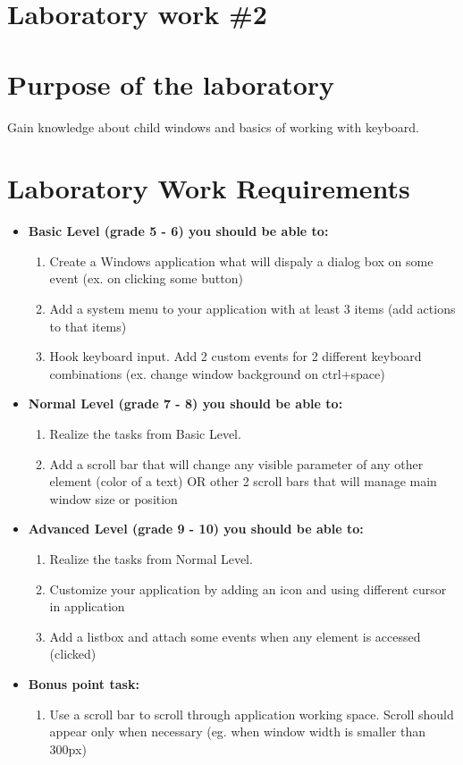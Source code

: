 \section*{Laboratory work \#2}

\section{Purpose of the laboratory}
Gain knowledge about child windows and basics of working with keyboard.
\section{Laboratory Work Requirements}
\begin{itemize}
\item \textbf{Basic Level (grade 5 - 6) you should be able to:}
	\begin{enumerate}
	\item Create a Windows application what will dispaly a dialog box on some event (ex. on clicking some button)
    \item Add a system menu to your application with at least 3 items (add actions to that items)
    \item Hook keyboard input. Add 2 custom events for 2 different keyboard combinations (ex. change window background on ctrl+space) 
	\end{enumerate}
	
\item \textbf{Normal Level (grade 7 - 8) you should be able to:}
      \begin{enumerate}
    \item Realize the tasks from Basic Level.
    \item Add a scroll bar that will change any visible parameter of any other element (color of a text) OR other 2 scroll bars that will manage main window size or position
          \end{enumerate}
          
\item \textbf{Advanced Level (grade 9 - 10) you should be able to:}
      \begin{enumerate}
    \item Realize the tasks from Normal Level.
    \item Customize your application by adding an icon and using different cursor in application
    \item Add a listbox and attach some events when any element is accessed (clicked)
          \end{enumerate}
          
\item \textbf{Bonus point task:}
      \begin{enumerate}
    \item Use a scroll bar to scroll through application working space. Scroll should appear only when necessary (eg. when window width is smaller than 300px)
    	\end{enumerate}
    	
  \end{itemize}  

\clearpage